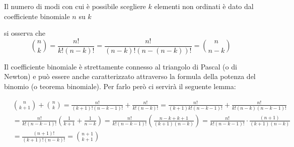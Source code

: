 \documentclass{report}
\begin{document}
Il numero di modi con cui è possibile scegliere  $k$ elementi non ordinati è dato dal coefficiente binomiale $n$ su $k$
\begin{myproof}
	si osserva che
	$$
		\binom{n}{k} = \frac{n!}{k!(n-k)!} = \frac{n!}{(n-k)!(n-(n-k))!} = \binom{n}{n-k}
	$$
\end{myproof}
\noindent Il coefficiente binomiale è strettamente connesso al triangolo di Pascal (o di Newton) e può essere anche caratterizzato attraverso la formula della potenza del binomio (o teorema binomiale). Per farlo però ci servirà il seguente lemma:
\begin{myproof}
	\begin{align*}
		&\binom{n}{k+1} + \binom{n}{k} = \frac{n!}{(k+1)!(n-k-1)!} + \frac{n!}{k!(n-k)!} = \frac{n!}{(k+1)k!(n-k-1)!} + \frac{n!}{k!(n-k)(n-k-1)!} \\ &= \frac{n!}{k!(n-k-1)!} \left( \frac{1}{k+1} + \frac{1}{n-k} \right) = \frac{n!}{k!(n-k-1)!} \left( \frac{n -k + k + 1}{(k+1)(n-k)} \right) = \frac{n!}{k!(n-k-1)!} \cdot \frac{(n+1)}{(k+1)(n-k)} \\ &= \frac{(n+1)!}{(k+1)!(n-k)!} = \binom{n+1}{k+1}
	\end{align*}
\end{myproof}
\end{document}
